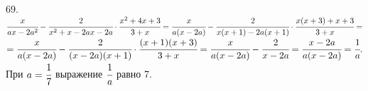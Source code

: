 69. $\cfrac{x}{ax-2a^2}-\cfrac{2}{x^2+x-2ax-2a}\cdot\cfrac{x^2+4x+3}{3+x}=\cfrac{x}{a(x-2a)}-\cfrac{2}{x(x+1)-2a(x+1)}\cdot\cfrac{x(x+3)+x+3}{3+x}=$\\$=
\cfrac{x}{a(x-2a)}-\cfrac{2}{(x-2a)(x+1)}\cdot\cfrac{(x+1)(x+3)}{3+x}=\cfrac{x}{a(x-2a)}-\cfrac{2}{x-2a}=
\cfrac{x-2a}{a(x-2a)}=\cfrac{1}{a}.$ При $a=\cfrac{1}{7}$ выражение $\cfrac{1}{a}$ равно 7.\\
